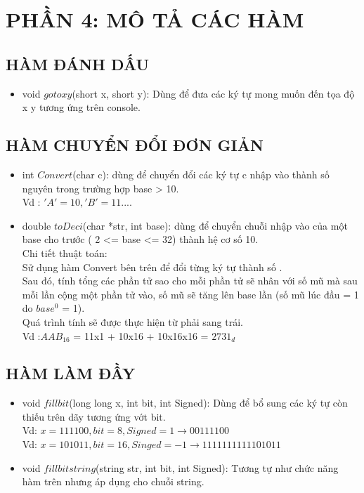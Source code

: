 \documentclass[12pt,a4paper]{article}
\begin{document}
\section{\textbf{\color{red}PHẦN 4: MÔ TẢ CÁC HÀM}}
\Large \subsection{\color{blue}\textbf{HÀM ĐÁNH DẤU} }
\begin{itemize}
    \item void $gotoxy$(short x, short y): Dùng để đưa các ký tự mong muốn đến tọa độ x y tương ứng trên console. \\
\end{itemize}
\Large \subsection{\color{blue}\textbf{HÀM CHUYỂN ĐỔI ĐƠN GIẢN} }
\begin{itemize}
    \item int $Convert$(char c): dùng để chuyển đổi các ký tự c nhập vào thành số nguyên trong trường hợp base > 10. \\
    Vd : $'A' = 10, 'B' = 11.... $
    \item double $toDeci$(char *str, int base): dùng để chuyển chuỗi nhập vào của một base cho trước ( 2 <= base <= 32) thành hệ cơ số 10.\\
    Chi tiết thuật toán:  \\
    Sử dụng hàm Convert bên trên để đổi từng ký tự thành số . \\
    Sau đó, tính tổng các phần tử sao cho mỗi phần tử sẽ nhân với số mũ mà sau mỗi lần cộng một phần tử vào, số mũ sẽ tăng lên base lần (số mũ lúc đầu = 1 do $base^0$ = 1). \\
    Quá trình tính sẽ được thực hiện từ phải sang trái. \\
    Vd :$ AAB_{16}$ = 11x1 + 10x16 + 10x16x16 = $2731_{d}$
\end{itemize}
\Large \subsection{\color{blue}\textbf{HÀM LÀM ĐẦY} }
\begin{itemize}
    \item void $fillbit$(long long x, int bit, int Signed): Dùng để bổ sung các ký tự còn thiếu trên dãy tương ứng vớt bit. \\
    Vd: $x = 111100, bit = 8, Signed = 1 \rightarrow  00111100$ \\
    Vd: $x = 101011, bit = 16, Singed = -1 \rightarrow 1111111111101011$ \\
    \item void $fillbitstring$(string str, int bit, int Signed): Tương tự như chức năng hàm trên nhưng áp dụng cho chuỗi string. \\
\end{itemize}
\end{document}
